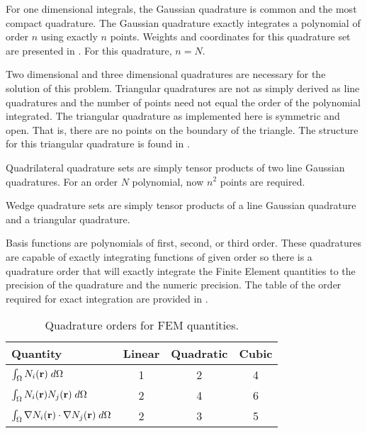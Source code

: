     For one dimensional integrals, the Gaussian quadrature is common and the 
    most compact quadrature. The Gaussian quadrature exactly integrates a 
    polynomial of order $n$ using exactly $n$ points. Weights and coordinates
    for this quadrature set are presented in \cite{gaussianQuadrature}. For this
    quadrature, $n=N$.
    
    Two dimensional and three dimensional quadratures are necessary for the 
    solution of this problem. Triangular quadratures are not as simply derived 
    as line quadratures and the number of points need not equal the order of the
    polynomial integrated. The triangular quadrature as implemented here is 
    symmetric and open. That is, there are no points on the boundary of the 
    triangle. The structure for this triangular quadrature is found in 
    \cite{triangleQuadrature}.
    
    Quadrilateral quadrature sets are simply tensor products of two line 
    Gaussian quadratures. For an order $N$ polynomial, now $n^2$ points are 
    required. 
    
    Wedge quadrature sets are simply tensor products of a line Gaussian 
    quadrature and a triangular quadrature. 
    
    Basis functions are polynomials of first, second, or third order. These 
    quadratures are capable of exactly integrating functions of given order so 
    there is a quadrature order that will exactly integrate the Finite Element 
    quantities to the precision of the quadrature and the numeric precision. The
    table of the order required for exact integration are provided in 
    .
    \begin{table}
      \caption{Quadrature orders for FEM quantities.}
      \label{tab:quadrature_orders}
      \begin{center}
        \begin{tabular}{lccc}
          \toprule
          Quantity & Linear & Quadratic & Cubic \\
          \midrule
          $\int_{\Omega} N_i(\mathbf{r}) \;d\Omega$ & 1 & 2 & 4\footnotemark \\
          $\int_{\Omega} N_i(\mathbf{r}) N_j(\mathbf{r}) \;d\Omega$ &
            2 & 4 & 6 \\
          $\int_{\Omega} \mathbf{\nabla} N_i(\mathbf{r}) \cdot \mathbf{\nabla} N_j(\mathbf{r}) 
            \;d\Omega$ & 2 & 3 & 5 \\
          \bottomrule
        \end{tabular}
      \end{center}
    \end{table}
    
